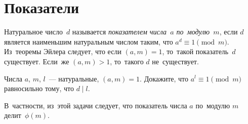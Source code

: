 
\section*{Показатели}


Натуральное число~$d$ называется \emph{показателем числа~$a$ по~модулю~$m$},
если $d$ является наименьшим натуральным числом таким, что
$a^d \equiv 1 \pmod{m}$. 
Из~теоремы Эйлера следует, что если $(a, m) = 1$, то~такой показатель~$d$
существует.
Если~же $(a, m) > 1$, то~такого $d$ не~существует.

\begin{problems}

\item
Числа $a$, $m$, $l$~--- натуральные, $(a, m) = 1$.
Докажите, что $a^l \equiv 1 \pmod{m}$ равносильно тому, что $d \mid l$.

\end{problems}

В~частности, из~этой задачи следует, что показатель числа $a$ по~модулю $m$
делит~$\phi(m)$.

